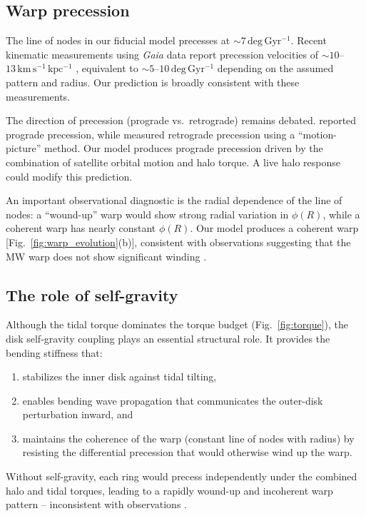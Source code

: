 \subsection{Warp precession}
\label{sec:precession}

The line of nodes in our fiducial model precesses at ${\sim}7\,\mathrm{deg\,Gyr^{-1}}$. Recent kinematic measurements using \textit{Gaia} data report precession velocities of ${\sim}10$--$13\,\mathrm{km\,s^{-1}\,kpc^{-1}}$ \citep{poggio2020, cheng2020}, equivalent to ${\sim}5$--$10\,\mathrm{deg\,Gyr^{-1}}$ depending on the assumed pattern and radius. Our prediction is broadly consistent with these measurements.

The direction of precession (prograde vs.\ retrograde) remains debated. \citet{poggio2020} reported prograde precession, while \citet{huang2024} measured retrograde precession using a ``motion-picture'' method. Our model produces prograde precession driven by the combination of satellite orbital motion and halo torque. A live halo response could modify this prediction.

An important observational diagnostic is the radial dependence of the line of nodes: a ``wound-up'' warp would show strong radial variation in $\phi(R)$, while a coherent warp has nearly constant $\phi(R)$. Our model produces a coherent warp [Fig.~\ref{fig:warp_evolution}(b)], consistent with observations suggesting that the MW warp does not show significant winding \citep{briggs1990}.

\subsection{The role of self-gravity}
\label{sec:selfgravity}

Although the tidal torque dominates the torque budget (Fig.~\ref{fig:torque}), the disk self-gravity coupling plays an essential structural role. It provides the bending stiffness that:
\begin{enumerate}
    \item stabilizes the inner disk against tidal tilting,
    \item enables bending wave propagation that communicates the outer-disk perturbation inward, and
    \item maintains the coherence of the warp (constant line of nodes with radius) by resisting the differential precession that would otherwise wind up the warp.
\end{enumerate}

Without self-gravity, each ring would precess independently under the combined halo and tidal torques, leading to a rapidly wound-up and incoherent warp pattern -- inconsistent with observations \citep{briggs1990}.


